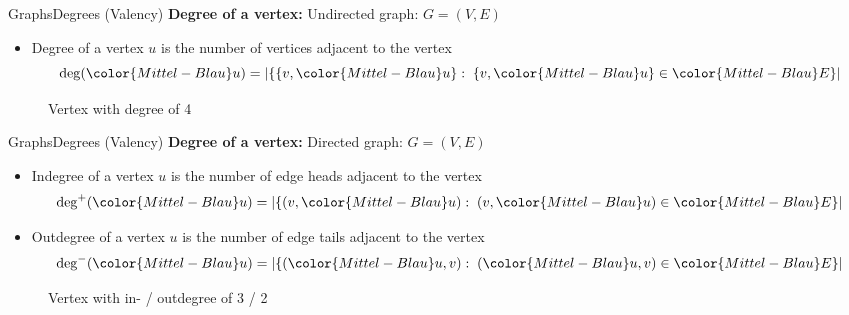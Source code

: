 \begin{frame}{Graphs}{Degrees (Valency)}
  \textbf{Degree of a vertex:} Undirected graph:
  {\color{Mittel-Blau}$G = (V , E)$}
  \begin{itemize}
    \item
      {\color{Mittel-Blau}Degree} of a vertex {\color{Mittel-Blau}$u$}
      is the number of {\color{Mittel-Blau}vertices} adjacent to the
      vertex
      \begin{displaymath}
        \mathrm{deg}({\color{Mittel-Blau}u}) =
        \left\vert \{
          \{v, {\color{Mittel-Blau}u}\}
          : \; \{v, {\color{Mittel-Blau}u}\} \in {\color{Mittel-Blau}E} \} 
        \right\vert
      \end{displaymath}
  \end{itemize}
  \begin{figure}
    \begin{adjustbox}{width=0.325\linewidth}
      
    \end{adjustbox}
    \caption{Vertex with degree of 4}
    \label{fig:graph:degree_undirected}
  \end{figure}
\end{frame}


\begin{frame}{Graphs}{Degrees (Valency)}
  \textbf{Degree of a vertex:} Directed graph:
  {\color{Mittel-Blau}$G = (V , E)$}
  \begin{itemize}
    \item
     {\color{Mittel-Blau}Indegree} of a vertex {\color{Mittel-Blau}$u$}
     is the number of {\color{Mittel-Blau}edge heads} adjacent to the
     vertex
     \begin{displaymath}
       \mathrm{deg}^{+}({\color{Mittel-Blau}u}) =
       \left\vert \{
         (v, {\color{Mittel-Blau}u})
         : \; (v, {\color{Mittel-Blau}u}) \in {\color{Mittel-Blau}E} \} 
       \right\vert
      \end{displaymath}
    \item
      {\color{Mittel-Blau}Outdegree} of a vertex {\color{Mittel-Blau}$u$}
      is the number of {\color{Mittel-Blau}edge tails} adjacent to the
      vertex
      \begin{displaymath}
        \mathrm{deg}^{-}({\color{Mittel-Blau}u}) =
        \left\vert \{
          ({\color{Mittel-Blau}u}, v)
          : \; ({\color{Mittel-Blau}u}, v) \in {\color{Mittel-Blau}E} \}
        \right\vert
      \end{displaymath}
  \end{itemize}
  \begin{figure}
    \begin{adjustbox}{width=0.325\linewidth}
      
    \end{adjustbox}
    \caption{Vertex with in- / outdegree of 3 / 2}
    \label{fig:graph:degree_directed}
  \end{figure}
\end{frame}

